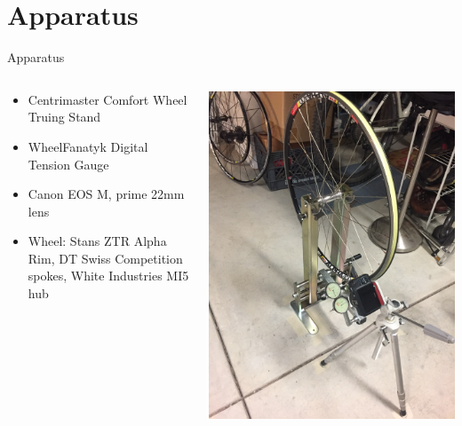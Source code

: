\documentclass[mathserif]{beamer}
\begin{document}
\section{Apparatus}
  \begin{frame}{Apparatus}
    \begin{columns}[T] 
    \begin{column}[T]{5cm} 
        \begin{itemize}
        \item Centrimaster Comfort Wheel Truing Stand
        \item WheelFanatyk Digital Tension Gauge
        \item Canon EOS M, prime 22mm lens
        \item Wheel:  Stans ZTR Alpha Rim, DT Swiss Competition spokes, White Industries MI5 hub
        \end{itemize}
 \end{column}
 \begin{column}[T]{5cm} %
      \includegraphics[totalheight=5cm, angle=-90]{apparatus}\\
 \end{column}
 \end{columns}
  \end{frame}
  
\end{document}
